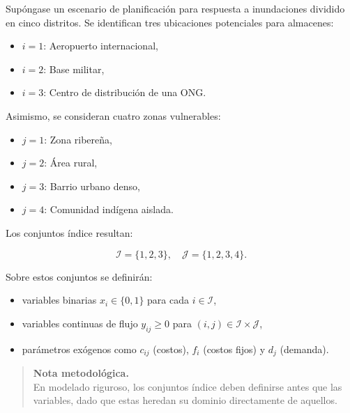 \documentclass[
  spanish,
  us-letterpaper,
]{scrreprt}
\providecommand{\tightlist}{%
  \setlength{\itemsep}{0pt}\setlength{\parskip}{0pt}}
\numberwithin{equation}{section}
\begin{document}
Supóngase un escenario de planificación para respuesta a inundaciones
dividido en cinco distritos. Se identifican tres ubicaciones potenciales
para almacenes:

\begin{itemize}
\tightlist
\item
  \(i = 1\): Aeropuerto internacional,\\
\item
  \(i = 2\): Base militar,\\
\item
  \(i = 3\): Centro de distribución de una ONG.
\end{itemize}

Asimismo, se consideran cuatro zonas vulnerables:

\begin{itemize}
\tightlist
\item
  \(j = 1\): Zona ribereña,\\
\item
  \(j = 2\): Área rural,\\
\item
  \(j = 3\): Barrio urbano denso,\\
\item
  \(j = 4\): Comunidad indígena aislada.
\end{itemize}

Los conjuntos índice resultan:

\[\mathcal{I} = \{1,2,3\}, \quad 
\mathcal{J} = \{1,2,3,4\}.\]

Sobre estos conjuntos se definirán:

\begin{itemize}
\tightlist
\item
  variables binarias \(x_i \in \{0,1\}\) para cada
  \(i \in \mathcal{I}\),\\
\item
  variables continuas de flujo \(y_{ij} \ge 0\) para
  \((i,j) \in \mathcal{I} \times \mathcal{J}\),\\
\item
  parámetros exógenos como \(c_{ij}\) (costos), \(f_i\) (costos fijos) y
  \(d_j\) (demanda).
\end{itemize}

\begin{quote}
\textbf{Nota metodológica.}\\
En modelado riguroso, los conjuntos índice deben definirse antes que las
variables, dado que estas heredan su dominio directamente de aquellos.
\end{quote}
\end{document}
